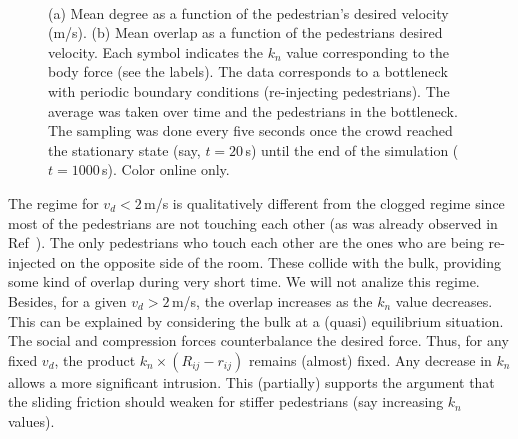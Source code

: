 \documentclass[preprint,12pt]{elsarticle}
\begin{document}
\begin{figure}[!htbp]
\centering
    \ 
    \\
\caption[width=0.47\columnwidth]{(a) Mean degree as a function of the pedestrian’s desired velocity (m/s). (b) Mean overlap as a function of the pedestrians desired velocity. Each symbol indicates the $k_n$ value corresponding to the body force (see the labels). The data corresponds to a bottleneck with periodic boundary conditions (re-injecting pedestrians). The average was taken over time and the pedestrians in the bottleneck. The sampling was done every five seconds once the crowd reached the stationary state (say, $t=20\,$s) until the end of the simulation ($t=1000\,$s). Color online only.}
\label{degree_overlap_vd}
\end{figure}

The regime for $v_d<2\,$m/s is qualitatively different from the clogged regime since most of the 
pedestrians are not touching each other (as was already observed in Ref~\cite{dorso_2005,dorso_2011}). The only pedestrians who touch each 
other are the ones who are being re-injected on the opposite side of the room.
These collide with the bulk, providing some kind of overlap during very short time. We will
not analize this regime.\\

Besides, for a given $v_d>2\,$m/s, the overlap increases as the $k_n$ value decreases. 
This can be explained by considering the bulk at a (quasi) equilibrium situation. 
The social and compression forces counterbalance the desired force. Thus, for any fixed $v_d$,
the product $k_n \times (R_{ij}-r_{ij})$ remains (almost) fixed. Any decrease in $k_n$
allows a more significant intrusion. This (partially) supports the argument that
the sliding friction should weaken for stiffer pedestrians (say increasing
$k_n$ values). \\  
\end{document}
